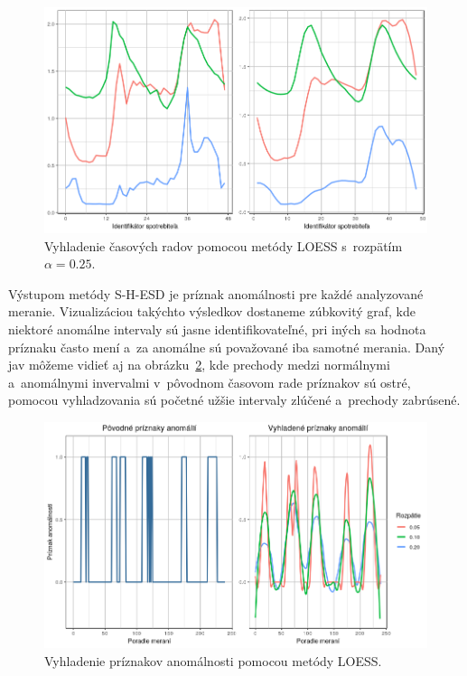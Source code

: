 \documentclass[a4paper,twoside,slovak,12pt,appendix]{article}
\begin{document}
\begin{figure}[htbp]
  \centering
  \includegraphics[width=\textwidth]{smoothing_example.png}
  \caption[Vyhladenie časových radov pomocou metódy LOESS.]{Vyhladenie časových radov pomocou metódy LOESS s~rozpätím $\alpha=0.25$.}
  \label{fig:smoothing-example}
\end{figure}

Výstupom metódy S-H-ESD je príznak anomálnosti pre každé analyzované meranie.
Vizualizáciou takýchto výsledkov dostaneme zúbkovitý graf, kde niektoré anomálne
intervaly sú jasne identifikovateľné, pri iných sa hodnota príznaku často mení
a~za anomálne sú považované iba samotné merania. Daný jav môžeme vidieť aj na
obrázku~\ref{fig:smoothing-anomalies}, kde prechody medzi normálnymi
a~anomálnymi invervalmi v~pôvodnom časovom rade príznakov sú ostré, pomocou
vyhladzovania sú početné užšie intervaly zlúčené a~prechody zabrúsené.

\begin{figure}[H]
  \centering
  \includegraphics[width=\textwidth]{smoothing_anomalies.png}
  \caption{Vyhladenie príznakov anomálnosti pomocou metódy LOESS.}
  \label{fig:smoothing-anomalies}
\end{figure}
\end{document}
